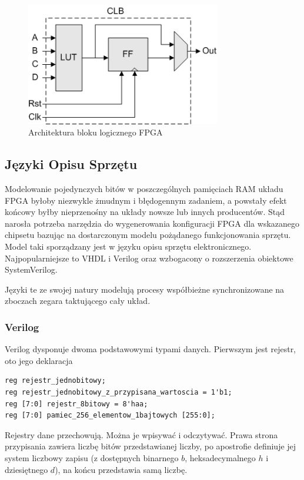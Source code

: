 \documentclass[a4paper,12pt]{article}
\begin{document}
\begin{figure}[htb]
   \centering
   \includegraphics[width=8.5cm]{grafika/obwody/CLB_Block_Diagram.png}
   \caption*{Architektura bloku logicznego FPGA}
\end{figure}

\newpage

\subsection{Języki Opisu Sprzętu}

Modelowanie pojedynczych bitów w poszczególnych pamięciach RAM układu FPGA byłoby niezwykle żmudnym i błędogennym zadaniem, a powstały efekt końcowy byłby nieprzenośny na układy nowsze lub innych producentów. Stąd narosła potrzeba narzędzia do wygenerowania konfiguracji FPGA dla wskazanego chipsetu bazując na dostarczonym modelu pożądanego funkcjonowania sprzętu. Model taki sporządzany jest w języku opisu sprzętu elektronicznego. Najpopularniejsze to VHDL i Verilog oraz wzbogacony o rozszerzenia obiektowe SystemVerilog.

Języki te ze swojej natury modelują procesy współbieżne synchronizowane na zboczach zegara taktującego cały układ.

\subsubsection{Verilog}

Verilog dysponuje dwoma podstawowymi typami danych. Pierwszym jest rejestr, oto jego deklaracja
\begin{lstlisting}[label=reg,caption=Rejestr]
reg rejestr_jednobitowy;
reg rejestr_jednobitowy_z_przypisana_wartoscia = 1'b1;
reg [7:0] rejestr_8bitowy = 8'haa;
reg [7:0] pamiec_256_elementow_1bajtowych [255:0];
\end{lstlisting}
Rejestry dane przechowują. Można je wpisywać i odczytywać. Prawa strona przypisania zawiera liczbę bitów przedstawianej liczby, po apostrofie definiuje jej system liczbowy zapisu (z dostępnych binarnego $b$, heksadecymalnego $h$ i dziesiętnego $d$), na końcu przedstawia samą liczbę.
\end{document}
